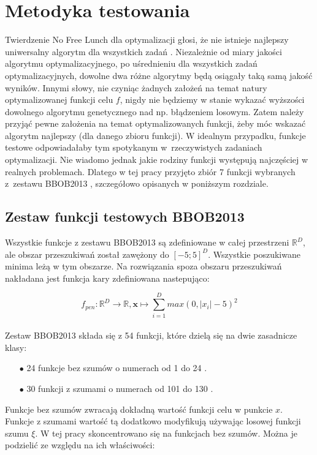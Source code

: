 \documentclass[a4paper,onecolumn,oneside,11pt,wide,floatssmall]{mwrep}
\theoremstyle{definition}
\theoremstyle{plain}%
\theoremstyle{remark}
\begin{document}
\chapter{Metodyka testowania}
\label{chap:metodyka}

Twierdzenie No Free Lunch dla optymalizacji głosi, że nie istnieje najlepszy uniwersalny algorytm dla wszystkich zadań \cite{lunch}. 
Niezależnie od miary jakości algorytmu optymalizacyjnego, po uśrednieniu dla wszystkich zadań optymalizacyjnych, 
dowolne dwa różne algorytmy będą osiągały taką samą jakość wyników. Innymi słowy,
nie czyniąc żadnych założeń na temat natury optymalizowanej funkcji celu $f$, 
nigdy nie będziemy w stanie wykazać wyższości dowolnego algorytmu genetycznego nad np. błądzeniem losowym. 
Zatem należy przyjąć pewne założenia na temat optymalizowanych funkcji, żeby móc wskazać algorytm najlepszy (dla danego zbioru funkcji).
W idealnym przypadku, funkcje testowe odpowiadałaby tym spotykanym w~rzeczywistych zadaniach optymalizacji.
Nie wiadomo jednak jakie rodziny funkcji występują najczęściej w realnych problemach.
Dlatego w tej pracy przyjęto zbiór 7 funkcji wybranych z~zestawu BBOB2013 \cite{noiseless}, szczegółowo opisanych w poniższym rozdziale.

\section{Zestaw funkcji testowych BBOB2013}
\label{sec:zestaw}

Wszystkie funkcje z zestawu BBOB2013 są zdefiniowane w całej przestrzeni $\mathbb{R}^D$, ale obszar
przeszukiwań został zawężony do $[-5; 5]^D$. Wszystkie poszukiwane minima leżą w tym obszarze.
Na rozwiązania spoza obszaru przeszukiwań nakładana jest funkcja kary zdefiniowana nastepująco: 

$$ f_{pen} : \mathbb{R}^D \rightarrow \mathbb{R}, 
\textbf{x} \mapsto \sum\limits_{i=1}^D max(0, |x_i| - 5)^2 $$ 
\\
Zestaw BBOB2013 składa się z 54 funkcji, które dzielą się na dwie zasadnicze klasy:

\begin{itemize}
 \item[$\bullet$] 24 funkcje bez szumów o numerach od 1 do 24 \cite{noiseless}. 
 \item[$\bullet$] 30 funkcji z szumami o numerach od 101 do 130 \cite{noisy}.
\end{itemize} 

Funkcje bez szumów zwracają dokładną wartość funkcji celu w punkcie $x$. Funkcje z szumami wartość tą dodatkowo modyfikują używając 
losowej funkcji szumu $\xi$. W tej pracy skoncentrowano się na funkcjach bez szumów. Można je podzielić ze względu
na ich właściwości:
\end{document}

